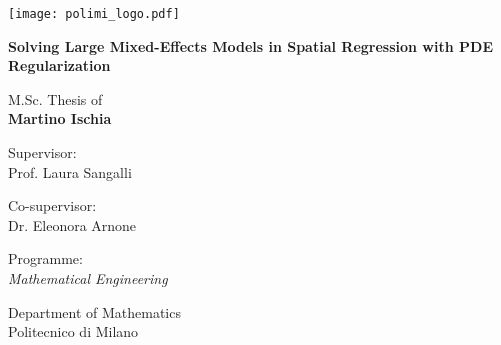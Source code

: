 
\newcommand{\myName}{Martino Ischia}
\newcommand{\myTitle}{Solving Large Mixed-Effects Models in Spatial Regression with PDE Regularization}
\newcommand{\myDegree}{Programme: \protect\\ \textit{Mathematical Engineering}}
\newcommand{\myDepartment}{Department of Mathematics}
\newcommand{\myUni}{Politecnico di Milano}
\newcommand{\myYear}{2023}
\newcommand{\myTime}{01 Feb \myYear}

\begin{titlepage}
	\texttt{[image: polimi\_logo.pdf]}
	\begin{addmargin}[3cm]{-1cm}
		\setlength{\parindent}{0pt} \vfill

		{
			\Huge\bfseries\myTitle
			\par
		}

		\vspace{2cm}

		{\Large M.Sc. Thesis of\\[0.125cm]}
		{\LARGE\bfseries\myName}

		\vspace{1cm}

		\large
		Supervisor:\\[0.125cm]
		{\Large Prof. Laura Sangalli}
		\vspace{0.5cm}

		\large
		Co-supervisor:\\[0.125cm]
		{\Large Dr. Eleonora Arnone}

		\vspace{2cm}

		\myDegree

		\vspace{0.5cm}

		\myDepartment \\
		\myUni

		\vfill
	\end{addmargin}
\end{titlepage}
